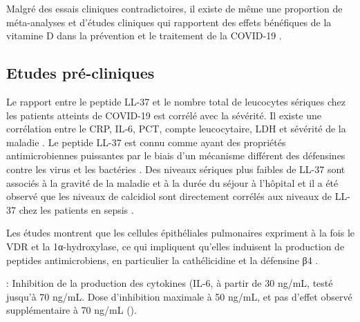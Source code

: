 \documentclass[
  a4paper,
  DIV=11,
  numbers=noendperiod,
  listof=totoc]{scrreprt}
\begin{document}
Malgré des essais cliniques contradictoires, il existe de même une
proportion de méta-analyses et d'études cliniques qui rapportent des
effets bénéfiques de la vitamine D dans la prévention et le traitement
de la COVID-19 \autocite{Pal.2022}.

\subsection{Etudes pré-cliniques}\label{etudes-pruxe9-cliniques}

Le rapport entre le peptide LL-37 et le nombre total de leucocytes
sériques chez les patients atteints de COVID-19 est corrélé avec la
sévérité. Il existe une corrélation entre le CRP, IL‑6, PCT, compte
leucocytaire, LDH et sévérité de la maladie \autocite{Keutmann.2022}. Le
peptide LL-37 est connu comme ayant des propriétés antimicrobiennes
puissantes par le biais d'un mécanisme différent des défensines contre
les virus et les bactéries \autocite{Cutuli.2024}. Des niveaux sériques
plus faibles de LL-37 sont associés à la gravité de la maladie et à la
durée du séjour à l'hôpital \autocite{Keutmann.2022} et il a été observé
que les niveaux de calcidiol sont directement corrélés aux niveaux de
LL-37 chez les patients en sepsis \autocite{Cutuli.2024}.

Les études montrent que les cellules épithéliales pulmonaires expriment
à la fois le \ac{VDR} et la 1α-hydroxylase, ce qui impliquent qu'elles
induisent la production de peptides antimicrobiens, en particulier la
cathélicidine et la défensine β4 \autocite{Cutuli.2024}.

\textcite{Zhang.2012}: Inhibition de la production des cytokines (IL-6,
à partir de 30 ng/mL, testé jusqu'à 70 ng/mL. Dose d'inhibition maximale
à 50 ng/mL, et pas d'effet observé supplémentaire à 70 ng/mL
().
\end{document}
